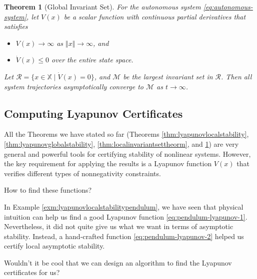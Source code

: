 \documentclass[
]{book}
\newtheorem{theorem}{Theorem}[chapter]
\theoremstyle{definition}
\theoremstyle{definition}
\theoremstyle{definition}
\theoremstyle{definition}
\theoremstyle{remark}
\begin{document}
\begin{theorem}[Global Invariant Set]
\protect\hypertarget{thm:globalinvariantsettheorem}{}\label{thm:globalinvariantsettheorem}For the autonomous system \eqref{eq:autonomous-system}, let \(V(x)\) be a scalar function with continuous partial derivatives that satisfies

\begin{itemize}
\item
  \(V(x) \rightarrow \infty\) as \(\Vert x \Vert \rightarrow \infty\), and
\item
  \(\dot{V}(x) \leq 0\) over the entire state space.
\end{itemize}

Let \(\mathcal{R} = \{ x\in \mathbb{X} \mid \dot{V}(x)= 0 \}\), and \(\mathcal{M}\) be the largest invariant set in \(\mathcal{R}\). Then all system trajectories asymptotically converge to \(\mathcal{M}\) as \(t \rightarrow \infty\).
\end{theorem}

\hypertarget{computing-lyapunov-certificates}{%
\subsection{Computing Lyapunov Certificates}\label{computing-lyapunov-certificates}}

All the Theorems we have stated so far (Theorems \ref{thm:lyapunovlocalstability}, \ref{thm:lyapunovglobalstability}, \ref{thm:localinvariantsettheorm}, and \ref{thm:globalinvariantsettheorem}) are very general and powerful tools for certifying stability of nonlinear systems. However, the key requirement for applying the results is a Lyapunov function \(V(x)\) that verifies different types of nonnegativity constraints.

How to find these functions?

In Example \ref{exm:lyapunovlocalstabilitypendulum}, we have seen that physical intuition can help us find a good Lyapunov function \eqref{eq:pendulum-lyapunov-1}. Nevertheless, it did not quite give us what we want in terms of asymptotic stability. Instead, a hand-crafted function \eqref{eq:pendulum-lyapunov-2} helped us certify local asymptotic stability.

Wouldn't it be cool that we can design an algorithm to find the Lyapunov certificates for us?
\end{document}
